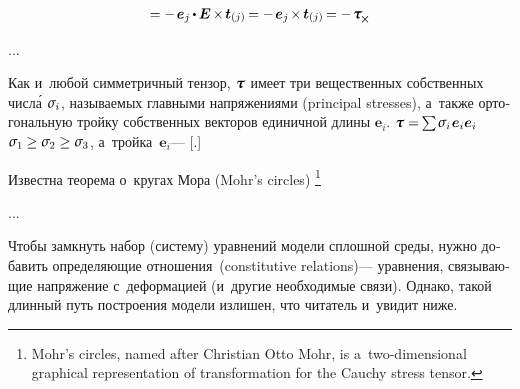\begin{otherlanguage}{russian}
\begin{multline*}
= - \hspace{.25ex} \bm{e}_{j} \hspace{-0.15ex} \dotp \hspace{-0.1ex} \UnitDyad \hspace{-0.2ex} \times \hspace{-0.25ex} \tractionvector{j}
= - \hspace{.25ex} \bm{e}_{j} \hspace{-0.25ex} \times \hspace{-0.2ex} \tractionvector{j}
= - \hspace{.2ex} \cauchystress_{\hspace{-0.1ex}\Xcompanion}
\end{multline*}


...


\end{otherlanguage}



\begin{otherlanguage}{russian}

Как и~любой симметричный тензор, $\cauchystress$ имеет три вещественных собственных числ\'{а} $\mathsigma_i$, называемых главными напряжениями (principal stresses), а~также ортогональную тройку собственных векторов единичной длины $\bm{e}_i$.
 ${\cauchystress = \hspace{-0.2ex} \sum \hspace{-0.16ex} \mathsigma_i \hspace{.16ex} \bm{e}_i \bm{e}_i}$   ${\mathsigma_1 \hspace{-0.1ex} \geq \mathsigma_2 \geq \mathsigma_3}$, а~тройка~${\bm{e}_i}$\:--- [.]

Известна теорема о~кругах Мора (Mohr’s circles)%
\footnote{Mohr’s circles, named after Christian Otto Mohr, is a~two-dimensional graphical representation of transformation for the Cauchy stress tensor.}

...



Чтобы замкнуть набор (систему) уравнений модели сплошной среды, нужно добавить определяющие отношения~(constitutive relations)\:--- уравнения, связывающие напряжение с~деформацией (и~другие необходимые связи). Однако,   такой длинный путь построения модели излишен, что читатель и~увидит ниже.

\end{otherlanguage}

